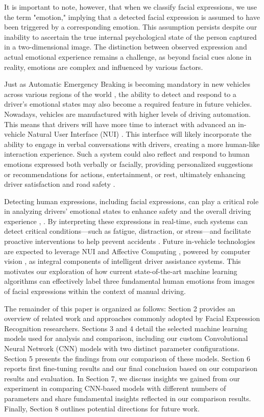 \documentclass[sigconf]{acmart}
\begin{document}
It is important to note, however, that when we classify facial expressions, we use the term "emotion," implying that a detected facial expression is assumed to have been triggered by a corresponding emotion. This assumption persists despite our inability to ascertain the true internal psychological state of the person captured in a two-dimensional image. The distinction between observed expression and actual emotional experience remains a challenge, as beyond facial cues alone in reality, emotions are complex and influenced by various factors.

Just as Automatic Emergency Braking is becoming mandatory in new vehicles across various regions of the world \cite{bengler2014three}, the ability to detect and respond to a driver's emotional states may also become a required feature in future vehicles. Nowadays, vehicles are manufactured with higher levels of driving automation. This means that drivers will have more time to interact with advanced an in-vehicle Natural User Interface (NUI) \cite{murali2022intelligent}. This interface will likely incorporate the ability to engage in verbal conversations with drivers, creating a more human-like interaction experience. Such a system could also reflect and respond to human emotions expressed both verbally or facially, providing personalized suggestions or recommendations for actions, entertainment, or rest, ultimately enhancing driver satisfaction and road safety \cite{murali2022intelligent}.

Detecting human expressions, including facial expressions, can play a critical role in analyzing drivers' emotional states to enhance safety and the overall driving experience \cite{murali2022intelligent}, \cite{zepf2020driver}. By interpreting these expressions in real-time, such systems can detect critical conditions—such as fatigue, distraction, or stress—and facilitate proactive interventions to help prevent accidents \cite{murali2022intelligent}. Future in-vehicle technologies are expected to leverage NUI and Affective Computing \cite{picard2003affective}, powered by computer vision \cite{kang2019extracting}, as integral components of intelligent driver assistance systems. This motivates our exploration of how current state-of-the-art machine learning algorithms can effectively label three fundamental human emotions from images of facial expressions within the context of manual driving.


The remainder of this paper is organized as follows: Section 2 provides an overview of related work and approaches commonly adopted by Facial Expression Recognition researchers. Sections 3 and 4 detail the selected machine learning models used for analysis and comparison, including our custom Convolutional Neural Network (CNN) models with two distinct parameter configurations. Section 5 presents the findings from our comparison of these models. Section 6 reports first fine-tuning results and our final conclusion based on our comparison results and evaluation. In Section 7, we discuss insights we gained from our experiment in comparing CNN-based models with different numbers of parameters and share fundamental insights reflected in our comparison results. Finally, Section 8 outlines potential directions for future work.
\end{document}
